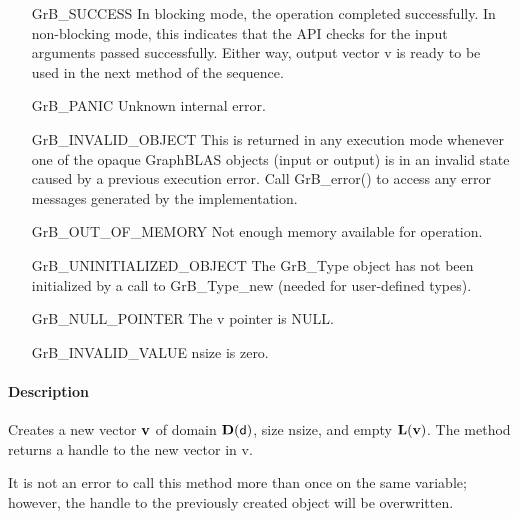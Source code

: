 \begin{itemize}[leftmargin=2.1in]
    \item[{\sf GrB\_SUCCESS}]         In blocking mode, the operation completed
    successfully. In non-blocking mode, this indicates that the API checks 
    for the input arguments passed successfully. Either way, output vector 
    {\sf v} is ready to be used in the next method of the sequence.

    \item[{\sf GrB\_PANIC}]           Unknown internal error.
    
    \item[{\sf GrB\_INVALID\_OBJECT}] This is returned in any execution mode 
    whenever one of the opaque GraphBLAS objects (input or output) is in an invalid 
    state caused by a previous execution error.  Call {\sf GrB\_error()} to access 
    any error messages generated by the implementation.

    \item[{\sf GrB\_OUT\_OF\_MEMORY}] Not enough memory available for operation.
    
    \item[{\sf GrB\_UNINITIALIZED\_OBJECT}]  The {\sf GrB\_Type} object has not 
    been initialized by a call to {\sf GrB\_Type\_new} (needed for user-defined types).
    
    \item[{\sf GrB\_NULL\_POINTER}]  The {\sf v} pointer is {\sf NULL}.
    
    \item[{\sf GrB\_INVALID\_VALUE}] {\sf nsize} is zero.
\end{itemize}

\paragraph{Description}

Creates a new vector ${\bf v}$ of domain $\mathbf{D}({\sf d})$, size {\sf nsize}, 
and empty $\mathbf{L}({\bf v})$. The method returns a handle to the new vector in {\sf v}.

It is not an error to call this method more than once on the same variable;  
however, the handle to the previously created object will be overwritten. 


